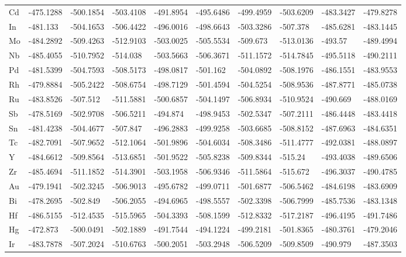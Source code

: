 \begin{table}[h]
{\begin{tabular}{*{10}{l}}
    Cd & -475.1288 & -500.1854 & -503.4108 & -491.8954 & -495.6486 & -499.4959 & -503.6209 & -483.3427 & -479.8278 \\
    In & -481.133  & -504.1653 & -506.4422 & -496.0016 & -498.6643 & -503.3286 & -507.378  & -485.6281 & -483.1445 \\
    Mo & -484.2892 & -509.4263 & -512.9103 & -503.0025 & -505.5534 & -509.673  & -513.0136 & -493.57   & -489.4994 \\
    Nb & -485.4055 & -510.7952 & -514.038  & -503.5663 & -506.3671 & -511.1572 & -514.7845 & -495.5118 & -490.2111 \\
    Pd & -481.5399 & -504.7593 & -508.5173 & -498.0817 & -501.162  & -504.0892 & -508.1976 & -486.1551 & -483.9553 \\
    Rh & -479.8884 & -505.2422 & -508.6754 & -498.7129 & -501.4594 & -504.5254 & -508.9536 & -487.8771 & -485.0738 \\
    Ru & -483.8526 & -507.512  & -511.5881 & -500.6857 & -504.1497 & -506.8934 & -510.9524 & -490.669  & -488.0169 \\
    Sb & -478.5169 & -502.9708 & -506.5211 & -494.874  & -498.9453 & -502.5347 & -507.2111 & -486.4448 & -483.4418 \\
    Sn & -481.4238 & -504.4677 & -507.847  & -496.2883 & -499.9258 & -503.6685 & -508.8152 & -487.6963 & -484.6351 \\
    Tc & -482.7091 & -507.9652 & -512.1064 & -501.9896 & -504.6034 & -508.3486 & -511.4777 & -492.0381 & -488.0897 \\
    Y  & -484.6612 & -509.8564 & -513.6851 & -501.9522 & -505.8238 & -509.8344 & -515.24   & -493.4038 & -489.6506 \\
    Zr & -485.4694 & -511.1852 & -514.3901 & -503.1958 & -506.9346 & -511.5864 & -515.672  & -496.3037 & -490.4785 \\
    Au & -479.1941 & -502.3245 & -506.9013 & -495.6782 & -499.0711 & -501.6877 & -506.5462 & -484.6198 & -483.6909 \\
    Bi & -478.2695 & -502.849  & -506.2055 & -494.6965 & -498.5557 & -502.3398 & -506.7999 & -485.7536 & -483.1348 \\
    Hf & -486.5155 & -512.4535 & -515.5965 & -504.3393 & -508.1599 & -512.8332 & -517.2187 & -496.4195 & -491.7486 \\
    Hg & -472.873  & -500.0491 & -502.1889 & -491.7544 & -494.1224 & -499.2181 & -501.8365 & -480.3761 & -479.2046 \\
    Ir & -483.7878 & -507.2024 & -510.6763 & -500.2051 & -503.2948 & -506.5209 & -509.8509 & -490.979  & -487.3503 \\

\end{tabular}}
\end{table}
